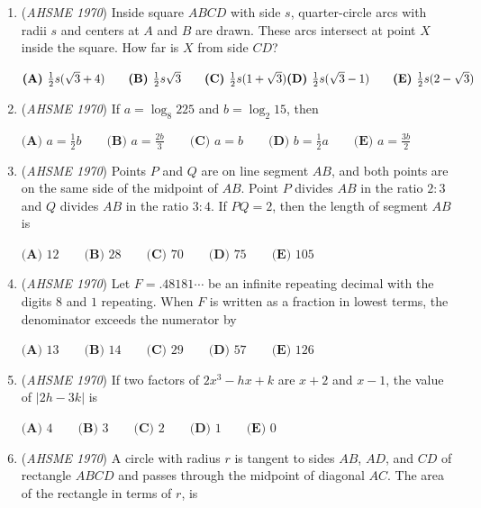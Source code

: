 \begin{enumerate}
 $\textbf{(A) }-16.25\qquad \textbf{(B) }-16\qquad \textbf{(C) }-15\qquad \textbf{(D) }-8\qquad  \textbf{(E) }\text{None of these}$


	\item (\textit{AHSME 1970}) Inside square $ABCD$ with side $s$, quarter-circle arcs with radii $s$ and centers at $A$ and $B$ are drawn. 
These arcs intersect at point $X$ inside the square. How far is $X$ from side $CD$?


 $\textbf{(A) }\frac{1}{2}s(\sqrt{3}+4)\qquad \textbf{(B) }\frac{1}{2}s\sqrt{3}\qquad \textbf{(C) }\frac{1}{2}s(1+\sqrt{3})\qquad\\ \textbf{(D) }\frac{1}{2}s(\sqrt{3}-1)\qquad  \textbf{(E) }\frac{1}{2}s(2-\sqrt{3})$


	\item (\textit{AHSME 1970}) If $a=\log_8{225}$ and $b=\log_2{15}$, then


 $\textbf{(A) }a=\frac{1}{2}b\qquad \textbf{(B) }a=\frac{2b}{3}\qquad \textbf{(C) }a=b\qquad \textbf{(D) }b=\frac{1}{2}a\qquad \textbf{(E) }a=\frac{3b}{2}$


	\item (\textit{AHSME 1970}) Points $P$ and $Q$ are on line segment $AB$, and both points are on the same side of the midpoint of $AB$.
Point $P$ divides $AB$ in the ratio $2:3$ and $Q$ divides $AB$ in the ratio $3:4$. If $PQ=2$, then the length of segment $AB$ is


 $\textbf{(A) }12\qquad \textbf{(B) }28\qquad \textbf{(C) }70\qquad \textbf{(D) }75\qquad  \textbf{(E) }105$


	\item (\textit{AHSME 1970}) Let $F=.48181\cdots$ be an infinite repeating decimal with the digits $8$ and $1$ repeating. 
When $F$ is written as a fraction in lowest terms, the denominator exceeds the numerator by


 $\textbf{(A) }13\qquad \textbf{(B) }14\qquad \textbf{(C) }29\qquad \textbf{(D) }57\qquad  \textbf{(E) }126$


	\item (\textit{AHSME 1970}) If two factors of $2x^3-hx+k$ are $x+2$ and $x-1$, the value of $|2h-3k|$ is


 $\textbf{(A) }4\qquad \textbf{(B) }3\qquad \textbf{(C) }2\qquad \textbf{(D) }1\qquad  \textbf{(E) }0$


	\item (\textit{AHSME 1970}) A circle with radius $r$ is tangent to sides $AB$, $AD$, and $CD$ of rectangle $ABCD$ and passes through
the midpoint of diagonal $AC$. The area of the rectangle in terms of $r$, is



\end{enumerate}
